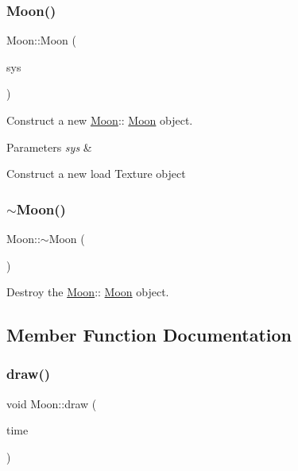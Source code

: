 \subsubsection{\texorpdfstring{Moon()}{Moon()}}
{\footnotesize\ttfamily Moon\+::\+Moon (\begin{DoxyParamCaption}\item[{\mbox{\hyperlink{classSolarSystem}{Solar\+System}} $\ast$}]{sys }\end{DoxyParamCaption})}



Construct a new \mbox{\hyperlink{classMoon}{Moon}}\+:\+: \mbox{\hyperlink{classMoon}{Moon}} object. 


\begin{DoxyParams}{Parameters}
{\em sys} & \\
\hline
\end{DoxyParams}
Construct a new load Texture object \mbox{\label{classMoon_a3c2a0d46f278ee7ecf924c4a31da15f1}} 
\subsubsection{\texorpdfstring{$\sim$Moon()}{~Moon()}}
{\footnotesize\ttfamily Moon\+::$\sim$\+Moon (\begin{DoxyParamCaption}{ }\end{DoxyParamCaption})}



Destroy the \mbox{\hyperlink{classMoon}{Moon}}\+:\+: \mbox{\hyperlink{classMoon}{Moon}} object. 



\subsection{Member Function Documentation}
\mbox{\label{classMoon_af5b3e353fcb5f042f34dd7495f396b1d}} 
\subsubsection{\texorpdfstring{draw()}{draw()}}
{\footnotesize\ttfamily void Moon\+::draw (\begin{DoxyParamCaption}\item[{G\+Luint}]{time }\end{DoxyParamCaption})}



